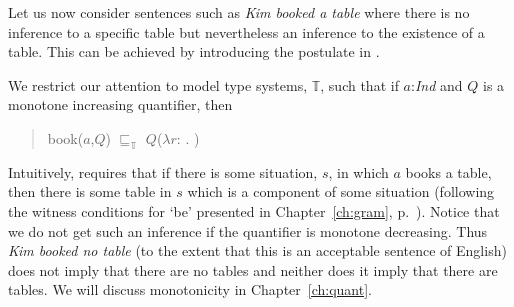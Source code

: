 Let us now consider sentences such as \textit{Kim booked a table}
where there is no inference to a specific table but nevertheless an
inference to the existence of a table. This can be achieved by
introducing the postulate in \nexteg{}.
\begin{ex} 
We restrict our attention to model type systems, $\mathbb{T}$, such
that if $a$:\textit{Ind} and $Q$ is a monotone increasing quantifier, then
\begin{quote}
book($a$,$Q$) $\sqsubseteq_{\mathbb{T}}$ 
$Q$($\lambda r$:
.  ) 
\end{quote}

\end{ex} 
Intuitively, \preveg{} requires that if there is some situation, $s$, in which
$a$ books a table, then there is some table in $s$ which is a component of
some situation (following the witness conditions for `be' presented in
Chapter~\ref{ch:gram}, p.~\pageref{ex:pred-be}).  Notice that we do not get such an inference
if the quantifier is monotone decreasing.  Thus \textit{Kim booked no
  table} (to the extent that this is an acceptable sentence of
English) does not imply that there are no tables and neither does it
imply that there are tables.  We will discuss monotonicity in
Chapter~\ref{ch:quant}.

